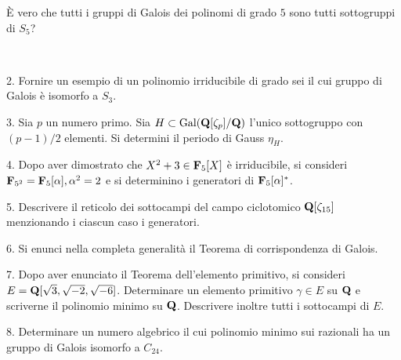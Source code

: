  \`E vero che tutti i gruppi di Galois dei polinomi di grado $5$ sono tutti sottogruppi di $S_5$?\medskip\bigskip\bigskip

\ \dotfill\ \bigskip\bigskip\bigskip


\vfil\eject


\item{2.} Fornire un esempio di un polinomio irriducibile di grado sei il cui gruppo di Galois \`e isomorfo a $S_3$.\vv


\item{3.} Sia $p$ un numero primo. Sia $H\subset{\rm Gal}({\bf Q}[\zeta_p]/{\bf Q})$
l'unico sottogruppo con $(p-1)/2$ elementi. Si determini il periodo di Gauss $\eta_H$.
\ve\ \vs


\item{4.} Dopo aver dimostrato che $X^2+3\in{\bf F}_5[X]$ \`e irriducibile, si consideri 
${\bf F}_{5^2}={\bf F}_5[\alpha], \alpha^2=2$ e si determinino i generatori di ${\bf F}_5[\alpha]^*$. 

\vv

\item{5.} Descrivere il reticolo dei sottocampi del campo ciclotomico ${\bf Q}[\zeta_{15}]$ menzionando i ciascun caso i generatori.
\ve\ \vs


\item{6.} Si enunci nella completa generalit\`a il Teorema di
corrispondenza di Galois.\vskip7cm\vv\vv


\item{7.} Dopo aver enunciato il Teorema dell'elemento primitivo, si consideri  $E={\bf Q}[\sqrt{3},\sqrt{-2},\sqrt{-6}]$. 
Determinare un elemento primitivo $\gamma\in E$ su ${\bf Q}$ e scriverne il polinomio minimo su ${\bf Q}$. Descrivere inoltre tutti 
i sottocampi di $E$.\vskip7cm\vv\vv

\item{8.} Determinare un numero algebrico il cui polinomio minimo sui razionali ha un gruppo di 
Galois isomorfo a $C_{24}$.

\vv



\ \vst
 \bye
